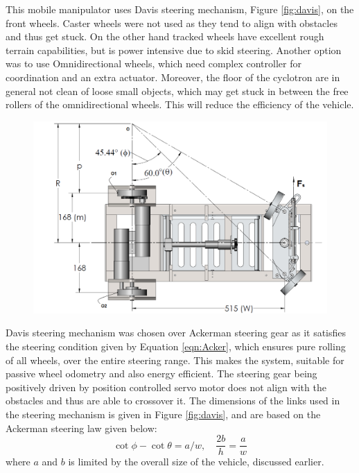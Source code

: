 This mobile manipulator uses Davis steering mechanism,  Figure \ref{fig:davis},  on the front wheels. Caster wheels  were not used as they tend to align with  obstacles and thus get stuck. On the  other hand tracked wheels have excellent rough terrain capabilities, but is power intensive due to skid steering. Another option was to use   Omnidirectional wheels, which need complex controller for coordination and an extra actuator. Moreover, the  floor of the cyclotron are  in general not clean of loose small objects, which may get stuck in between the free rollers of the omnidirectional wheels. This will reduce the efficiency of the vehicle.  

\begin{figure}
 	\centering
	\includegraphics[width=\linewidth,keepaspectratio]{Chapter3/fig/steerringCondition}
	\label{fig:steerCond} 
\end{figure} 
 

Davis steering mechanism was chosen over Ackerman steering gear as it satisfies the steering condition given by  Equation \ref{eqn:Acker}, which ensures pure rolling of all  wheels, over the entire steering range. This makes the system, suitable for passive wheel odometry and also energy efficient.  The steering gear being positively driven by position controlled servo motor does not align with the obstacles and thus are able to crossover it. The dimensions of the links used in the steering mechanism is given in Figure \ref{fig:davis}, and are based on the Ackerman steering law given below:
\begin{equation}
\label{eqn:Acker}
\cot\phi-\cot\theta=a/w, \quad  \frac{2b}{h}=\frac{a}{w}
\end{equation}
where $a$ and $b$ is limited by the overall size of the vehicle, discussed earlier.

